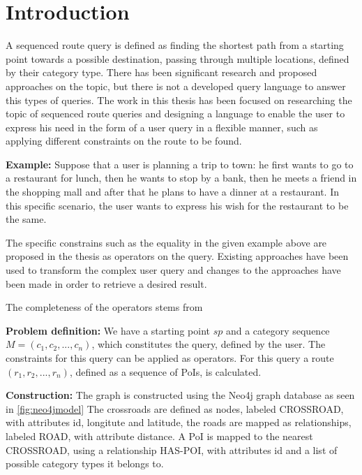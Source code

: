 \chapter{Introduction}
\label{sec:intro}
A sequenced route query is defined as finding the shortest path from a starting point towards a possible destination, passing through multiple locations, defined by their category type. There has been significant research and proposed approaches on the topic, but there is not a developed query language to answer this types of queries. The work in this thesis has been focused on researching the topic of sequenced route queries and designing a language to enable the user to express his need in the form of a user query in a flexible manner, such as applying different constraints on the route to be found. 

\textbf{Example:}
Suppose that a user is planning a trip to town: he first wants to go to a restaurant for lunch, then he wants to stop by a bank, then he meets a friend in the shopping mall and after that he plans to have a dinner at a restaurant. In this specific scenario, the user wants to express his wish for the restaurant to be the same.

The specific constrains such as the equality in the given example above are proposed in the thesis as operators on the query. Existing approaches have been used to transform the complex user query and changes to the approaches have been made in order to retrieve a desired result. 

The completeness of the operators stems from %

\textbf{Problem definition:}
We have a starting point $sp$ and a category sequence $M = (c_1, c_2, ..., c_n)$, which constitutes the query, defined by the user. The constraints for this query can be applied as operators.
For this query a route $(r_1, r_2, ..., r_n)$, defined as a sequence of PoIs, is calculated.

\textbf{Construction:}
The graph is constructed using the Neo4j graph database as seen in \ref{fig:neo4jmodel}
The crossroads are defined as nodes, labeled CROSSROAD, with attributes id, longitute and latitude, the roads are mapped as relationships, labeled ROAD, with attribute distance. A PoI is mapped to the nearest CROSSROAD, using a relationship HAS-POI, with attributes id and a list of possible category types it belongs to. \cite{evagian}

